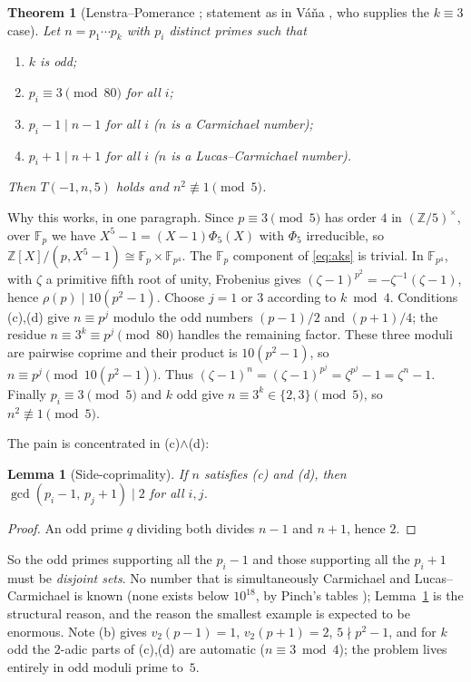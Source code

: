 \documentclass[10pt]{article}
\newtheorem{theorem}{Theorem}
\newtheorem{lemma}{Lemma}
\newcommand{\Z}{\mathbb{Z}}
\newcommand{\F}{\mathbb{F}}
\begin{document}
\begin{theorem}[Lenstra--Pomerance \cite{LPremarks}; statement as in
V\'a\v{n}a \cite{Vana09}, who supplies the $k\equiv 3$ case]\label{thm:lp}
Let $n = p_1\cdots p_k$ with $p_i$ distinct primes such that
\begin{enumerate}\itemsep0pt
\item[(a)] $k$ is odd;
\item[(b)] $p_i \equiv 3 \pmod{80}$ for all $i$;
\item[(c)] $p_i - 1 \mid n-1$ for all $i$ \quad ($n$ is a Carmichael number);
\item[(d)] $p_i + 1 \mid n+1$ for all $i$ \quad ($n$ is a Lucas--Carmichael number).
\end{enumerate}
Then $T(-1,n,5)$ holds and $n^2 \not\equiv 1 \pmod 5$.
\end{theorem}

Why this works, in one paragraph. Since $p \equiv 3 \pmod 5$ has order $4$ in
$(\Z/5)^\times$, over $\F_p$ we have $X^5-1 = (X-1)\Phi_5(X)$ with $\Phi_5$
irreducible, so $\Z[X]/(p, X^5-1) \cong \F_p \times \F_{p^4}$. The $\F_p$
component of \eqref{eq:aks} is trivial. In $\F_{p^4}$, with $\zeta$ a primitive
fifth root of unity, Frobenius gives
$(\zeta-1)^{p^2}=-\zeta^{-1}(\zeta-1)$, hence
$\rho(p)\mid10(p^2-1)$. Choose $j=1$ or $3$ according to $k\bmod4$.
Conditions (c),(d) give $n\equiv p^j$ modulo the odd numbers $(p-1)/2$ and
$(p+1)/4$; the residue $n\equiv3^k\equiv p^j\pmod{80}$ handles the remaining
factor. These three moduli are pairwise coprime and their product is
$10(p^2-1)$, so $n\equiv p^j\pmod{10(p^2-1)}$.
Thus $(\zeta-1)^n=(\zeta-1)^{p^j}=\zeta^{p^j}-1=\zeta^n-1$.
Finally $p_i \equiv 3 \pmod 5$ and $k$ odd give $n \equiv 3^k \in \{2,3\}
\pmod 5$, so $n^2 \not\equiv 1 \pmod 5$.

The pain is concentrated in (c)$\wedge$(d):

\begin{lemma}[Side-coprimality]\label{lem:sides}
If $n$ satisfies (c) and (d), then $\gcd(p_i-1,\, p_j+1) \mid 2$ for all $i,j$.
\end{lemma}
\begin{proof}
An odd prime $q$ dividing both divides $n-1$ and $n+1$, hence $2$.
\end{proof}

So the odd primes supporting all the $p_i-1$ and those supporting all the
$p_i+1$ must be \emph{disjoint sets}. No number that is simultaneously
Carmichael and Lucas--Carmichael is known (none exists below $10^{18}$, by
Pinch's tables \cite{Pinch}); Lemma~\ref{lem:sides} is the structural reason,
and the reason the smallest example is expected to be enormous. Note (b) gives
$v_2(p-1)=1$, $v_2(p+1)=2$, $5 \nmid p^2-1$, and for $k$ odd the $2$-adic parts
of (c),(d) are automatic ($n \equiv 3 \bmod 4$); the problem lives entirely in
odd moduli prime to~$5$.
\end{document}
